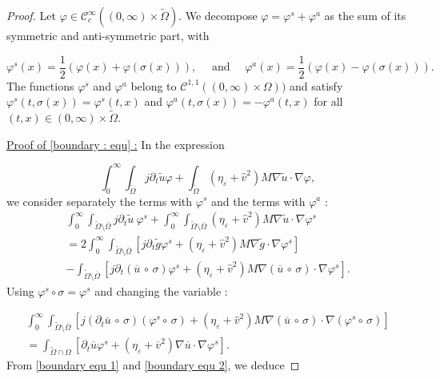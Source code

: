 \documentclass[reqno,12pt,twoside]{amsart}
\numberwithin{equation}{section} \numberwithin{theorem}{section}
\numberwithin{proposition}{section} \numberwithin{lemma}{section}
\numberwithin{corollary}{section}
\numberwithin{definition}{section} \numberwithin{remark}{section}
\begin{document}
\begin{proof}
Let $\varphi \in \mathcal{C}_c^\infty ((0,\infty)\times \widetilde{\Omega})$. We decompose $\varphi = \varphi ^s +\varphi^a$ as the sum of its symmetric and anti-symmetric part, with 

\[\varphi^s(x) = \frac{1}{2}( \varphi(x) + \varphi (\sigma (x))), \quad \text{ and } \quad \varphi^a(x) = \frac{1}{2}( \varphi(x) - \varphi (\sigma (x))).\]
The functions $\varphi^s$ and $\varphi ^a$ belong to $\mathcal{C}^{1,1}((0,\infty)\times \Omega))$ and satisfy $\varphi ^s(t,\sigma(x)) = \varphi ^s(t,x)$ and $\varphi ^a (t, \sigma(x)) = - \varphi ^a(t,x)$ for all $(t,x) \in (0,\infty) \times \widetilde{\Omega}$. 

\medskip

\underline{Proof of \eqref{boundary : equ} :} In the expression   

\[\int_0^\infty \int_{\widetilde{\Omega}} j \partial_t \widetilde{u} \varphi + \int_{\widetilde{\Omega}} (\eta_\varepsilon + \hat{v}^2 )M \nabla \widetilde{u} \cdot \nabla \varphi,\]
we consider separately the terms with $\varphi^s$ and the terms with $\varphi^a$ : 
\begin{multline}\label{boundary equ 1}
\int_0^\infty\int_{\widetilde{\Omega}\setminus \overline{\Omega}} j \partial_t \widetilde{u}\: \varphi^s  + \int_0^\infty \int_{\widetilde{\Omega}\setminus \overline{\Omega}} (\eta_\varepsilon + \hat{v}^2) M\nabla \widetilde{u} \cdot \nabla \varphi^s \\
= 2 \int_0^\infty \int_{\widetilde{\Omega}\setminus \overline{\Omega}} \left[j\partial_t \widetilde{g} \varphi^s +(\eta_\varepsilon + \hat{v}^2)M\nabla \widetilde{g} \cdot \nabla \varphi ^s\right]\\
- \int_{\widetilde{\Omega}\setminus \overline{\Omega}} \left[j\partial_t (\overline{u}\, \circ \, \sigma) \varphi^s + (\eta_\varepsilon + \hat{v}^2)M\nabla (\overline{u}\, \circ\, \sigma) \cdot \nabla \varphi ^s\right].
\end{multline}
Using $\varphi^s \circ \sigma = \varphi^s$ and changing the variable : 

\begin{multline}\label{boundary equ 2}
\int_0^\infty\int_{\widetilde{\Omega}\setminus \overline{\Omega}}\left[ j(\partial_t\overline{u}\, \circ \,\sigma)(\varphi^s \circ\, \sigma) + (\eta_\varepsilon + \hat{v}^2)M\nabla (\overline{u}\, \circ \,\sigma) \cdot \nabla (\varphi ^s \circ \,\sigma)\right]\\
= \int_{\widetilde{\Omega}\cap \Omega} \left[\partial_t \overline{u} \varphi^s + (\eta_\varepsilon + \overline{v}^2) \nabla \overline{u} \cdot \nabla \varphi^s\right].
\end{multline}
From \eqref{boundary equ 1} and \eqref{boundary equ 2}, we deduce 


\end{proof}
\end{document}
